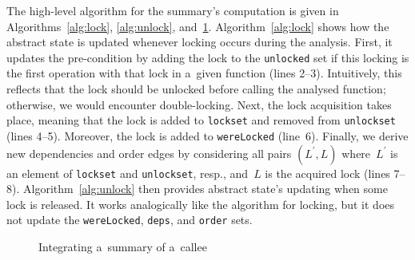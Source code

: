 \documentclass[runningheads]{llncs}
\begin{document}
The high-level algorithm for the summary's computation is given in
Algorithms~\ref{alg:lock}, \ref{alg:unlock}, and~\ref{alg:sum}.
Algorithm~\ref{alg:lock} shows how the abstract state is updated whenever
locking occurs during the analysis. First, it updates the pre-condition by
adding the lock to the \texttt{unlocked} set if this locking is the first
operation with that lock in a~given function (lines 2--3). Intuitively, this
reflects that the lock should be unlocked before calling the analysed
function; otherwise, we would encounter double-locking. Next, the lock
acquisition takes place, meaning that the lock is added to \texttt{lockset}
and removed from \texttt{unlockset} (lines 4--5). Moreover, the lock is
added to \texttt{wereLocked} (line~6). Finally, we derive new dependencies
and order edges by considering all pairs $ (L^\prime, L) $
where~$ L^\prime $ is an element of \texttt{lockset} and \texttt{unlockset},
resp., and~$ L $ is the acquired lock (lines 7--8).
Algorithm~\ref{alg:unlock} then provides abstract state's updating when
some lock is released. It works analogically like the algorithm for locking,
but it does not update the \texttt{wereLocked}, \texttt{deps}, and
\texttt{order} sets.

\begin{figure}[t]
\centering
\begin{algorithm}[H]
%
%
    \caption{Integrating a~summary of a~callee}
    \label{alg:sum}
\end{algorithm}
\vspace*{-6mm}
\end{figure}
\end{document}
